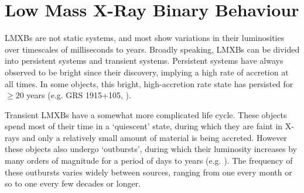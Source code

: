 \section{Low Mass X-Ray Binary Behaviour}

\par LMXBs are not static systems, and most show variations in their luminosities over timescales of milliseconds to years.  Broadly speaking, LMXBs can be divided into persistent systems and transient systems.  Persistent systems have always observed to be bright since their discovery, implying a high rate of accretion at all times.  In some objects, this bright, high-accretion rate state has persisted for $\geq20$ years (e.g. GRS 1915+105, \citealp{Deegan_1915}).
\par Transient LMXBs have a somewhat more complicated life cycle.  These objects spend most of their time in a `quiescent' state, during which they are faint in X-rays and only a relatively small amount of material is being accreted.  However these objects also undergo `outbursts', during which their luminosity increases by many orders of magnitude for a period of days to years (e.g. \citealp{Frank_Outbursts}).  The frequency of these outbursts varies widely between sources, ranging from one every month or so to one every few decades or longer.

\label{sec:states}

